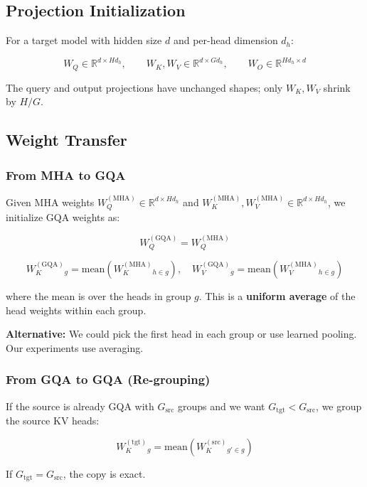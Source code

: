 \subsection{Projection Initialization}

For a target model with hidden size $d$ and per-head dimension $d_h$:

\[
W_Q \in \mathbb{R}^{d \times H d_h}, \qquad
W_K, W_V \in \mathbb{R}^{d \times G d_h}, \qquad
W_O \in \mathbb{R}^{H d_h \times d}
\tag{4.1}
\]

The query and output projections have unchanged shapes; only $W_K, W_V$ 
shrink by $H / G$.

\subsection{Weight Transfer}

\subsubsection{From MHA to GQA}

Given MHA weights $W_Q^{(\text{MHA})} \in \mathbb{R}^{d \times H d_h}$ and 
$W_K^{(\text{MHA})}, W_V^{(\text{MHA})} \in \mathbb{R}^{d \times H d_h}$, we 
initialize GQA weights as:

\[
W_Q^{(\text{GQA})} = W_Q^{(\text{MHA})}
\tag{4.2}
\]

\[
W_K^{(\text{GQA})}_g = \text{mean}\!\left(W_K^{(\text{MHA})}_{h \in g}\right), \quad
W_V^{(\text{GQA})}_g = \text{mean}\!\left(W_V^{(\text{MHA})}_{h \in g}\right)
\tag{4.3}
\]

where the mean is over the heads in group $g$. This is a \textbf{uniform average} 
of the head weights within each group.

\textbf{Alternative:} We could pick the first head in each group or use learned 
pooling. Our experiments use averaging.

\subsubsection{From GQA to GQA (Re-grouping)}

If the source is already GQA with $G_\text{src}$ groups and we want 
$G_\text{tgt} < G_\text{src}$, we group the source KV heads:

\[
W_K^{(\text{tgt})}_g = \text{mean}\!\left(W_K^{(\text{src})}_{g' \in g}\right)
\tag{4.4}
\]

If $G_\text{tgt} = G_\text{src}$, the copy is exact.

